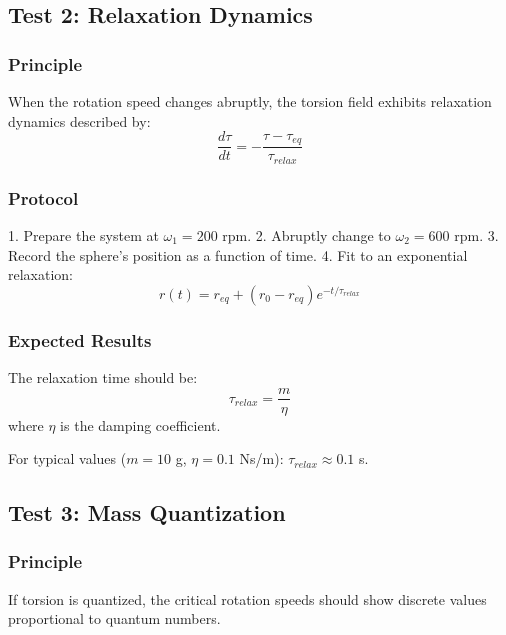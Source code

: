 \documentclass[12pt,a4paper]{article}
\begin{document}
\subsection{Test 2: Relaxation Dynamics}

\subsubsection{Principle}

When the rotation speed changes abruptly, the torsion field exhibits relaxation dynamics described by:
\begin{equation}
    \frac{d\tau}{dt} = -\frac{\tau - \tau_{eq}}{\tau_{relax}}
\end{equation}

\subsubsection{Protocol}

1. Prepare the system at $\omega_1 = 200$ rpm.
2. Abruptly change to $\omega_2 = 600$ rpm.
3. Record the sphere's position as a function of time.
4. Fit to an exponential relaxation:
\begin{equation}
    r(t) = r_{eq} + (r_0 - r_{eq})e^{-t/\tau_{relax}}
\end{equation}

\subsubsection{Expected Results}

The relaxation time should be:
\begin{equation}
    \tau_{relax} = \frac{m}{\eta}
\end{equation}
where $\eta$ is the damping coefficient.

For typical values ($m = 10$ g, $\eta = 0.1$ Ns/m): $\tau_{relax} \approx 0.1$ s.

\subsection{Test 3: Mass Quantization}

\subsubsection{Principle}

If torsion is quantized, the critical rotation speeds should show discrete values proportional to quantum numbers.
\end{document}
